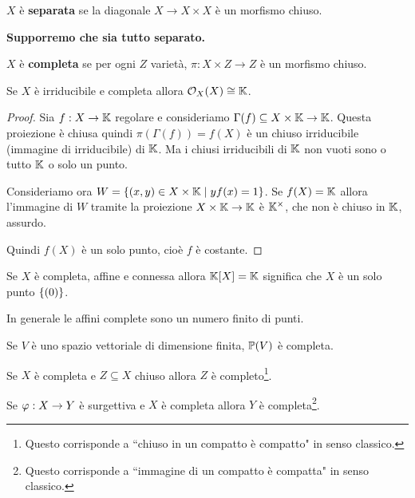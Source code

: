 \begin{definition}
$X$ \`e \textbf{separata} se la diagonale $X\to X\times X$ \`e un morfismo chiuso.
\end{definition}
\begin{center}
	\textbf{Supporremo che sia tutto separato.}
\end{center}

\begin{definition}
$X$ \`e \textbf{completa} se per ogni $Z$ variet\`a, $\pi:X\times Z\to Z$ \`e un morfismo chiuso.
\end{definition}

\begin{proposition}\label{PrRegolariSuCompleteIrriducibiliSonoCostanti}
Se $X$ \`e irriducibile e completa allora $\mathcal{O}_X(X)\cong \mathbb{K}$.
\end{proposition}
\begin{proof}
Sia $f:X\to \mathbb{K}$ regolare e consideriamo $\Gamma(f)\subseteq X\times \mathbb{K}\to \mathbb{K}$. Questa proiezione \`e chiusa quindi $\pi(\Gamma(f))=f(X)$ \`e un chiuso irriducibile (immagine di irriducibile) di $\mathbb{K}$. Ma i chiusi irriducibili di $\mathbb{K}$ non vuoti sono o tutto $\mathbb{K}$ o solo un punto.

Consideriamo ora $W=\left\{ (x,y)\in X\times \mathbb{K}\mid yf(x)=1\right\}$. Se $f(X)=\mathbb{K}$ allora l'immagine di $W$ tramite la proiezione $X\times \mathbb{K}\to \mathbb{K}$ \`e $\mathbb{K}^\times$, che non \`e chiuso in $\mathbb{K}$, assurdo.

Quindi $f(X)$ \`e un solo punto, cio\`e $f$ \`e costante.
\end{proof}
\begin{corollary}
Se $X$ \`e completa, affine e connessa allora $\mathbb{K}[X]=\mathbb{K}$ significa che $X$ \`e un solo punto $\left\{ (0)\right\}$.

In generale le affini complete sono un numero finito di punti.
\end{corollary}

\begin{theorem}\label{ThProiettiviSonoCompleti}
Se $V$ \`e uno spazio vettoriale di dimensione finita, $\mathbb{P}(V)$ \`e completa.
\end{theorem}


\begin{remark}
Se $X$ \`e completa e $Z\subseteq X$ chiuso allora $Z$ \`e completo\footnote{Questo corrisponde a ``chiuso in un compatto \`e compatto" in senso classico.}.
\end{remark}

\begin{remark}
Se $\varphi:X\to Y$ \`e surgettiva e $X$ \`e completa allora $Y$ \`e completa\footnote{Questo corrisponde a ``immagine di un compatto \`e compatta" in senso classico.}.
\end{remark}